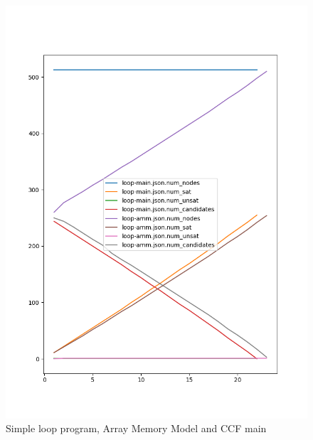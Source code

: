 \documentclass[12pt,twoside]{report}
\begin{document}
\begin{figure}
    \centering
    \includegraphics{figures/basic-loop.png}
    \caption{Simple loop program, Array Memory Model and CCF main}
    \label{fig:enter-label}
\end{figure}
\end{document}
